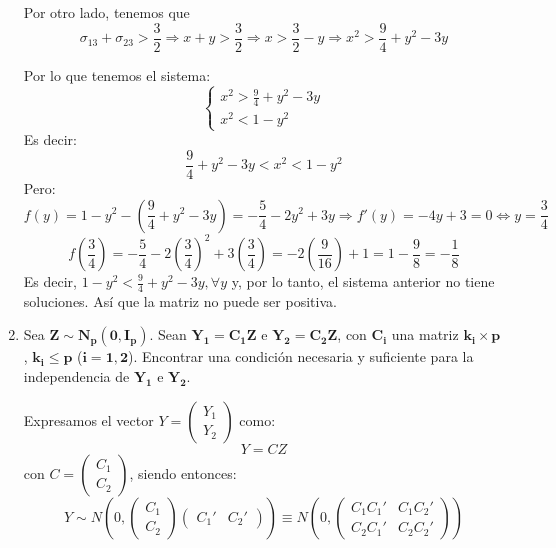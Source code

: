 \documentclass[11pt,a4paper]{article}
\begin{document}
\begin{enumerate}[label=\arabic*.]
Por otro lado, tenemos que
$$\sigma_{13} + \sigma_{23} > \frac{3}{2} \Rightarrow x + y > \frac{3}{2} \Rightarrow x > \frac{3}{2} - y \Rightarrow x^{2} > \frac{9}{4} + y^{2} - 3y$$

Por lo que tenemos el sistema:
$$\begin{cases}
x^{2} > \frac{9}{4} + y^{2} - 3y \\
x^{2} < 1 - y^{2}
\end{cases}$$
Es decir:
$$\frac{9}{4} + y^{2} - 3y < x^{2} < 1 - y^{2}$$
Pero:
$$f(y) = 1 - y^{2} - (\frac{9}{4} + y^{2} - 3y) = -\frac{5}{4} - 2y^{2} + 3y \Rightarrow f'(y) = -4y + 3 = 0 \iff y = \frac{3}{4}$$
$$f(\frac{3}{4}) = -\frac{5}{4} - 2(\frac{3}{4})^{2} + 3(\frac{3}{4}) = -2(\frac{9}{16}) + 1 = 1 - \frac{9}{8} = -\frac{1}{8}$$
Es decir, $1 - y^{2} < \frac{9}{4} + y^{2} - 3y, \forall y$ y, por lo tanto, el sistema anterior no tiene soluciones. Así que la matriz no puede ser positiva.

\newpage
\bfseries
\item Sea $\mathbf{Z \sim N_{p}(0, I_{p})}$. Sean $\mathbf{Y_{1} = C_{1}Z}$ e $\mathbf{Y_{2} = C_{2}Z}$, con $\mathbf{C_{i}}$ una matriz $\mathbf{k_{i} \times p}$, $\mathbf{k_{i} \leq p}$ ($\mathbf{i = 1, 2}$). Encontrar una condición necesaria y suficiente para la independencia de $\mathbf{Y_{1}}$ e $\mathbf{Y_{2}}$.
\vspace{0.5cm}
\normalfont

Expresamos el vector $Y = \begin{pmatrix} Y_{1} \\ Y_{2} \end{pmatrix}$ como:
$$Y = CZ$$
con $C = \begin{pmatrix} C_{1} \\ C_{2} \end{pmatrix}$, siendo entonces:
$$Y \sim N(0, \begin{pmatrix} C_{1} \\ C_{2} \end{pmatrix} \begin{pmatrix} C_{1}' & C_{2}' \end{pmatrix}) \equiv N(0, \begin{pmatrix}
C_{1}C_{1}' & C_{1}C_{2}' \\
C_{2}C_{1}' & C_{2}C_{2}'
\end{pmatrix})$$


\end{enumerate}
\end{document}
